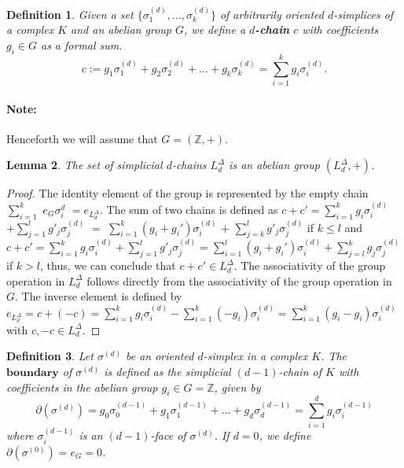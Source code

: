 \documentclass{amsart}
\newtheorem{definition}{Definition}[section]
\newtheorem{lemma}[definition]{Lemma}
\begin{document}
\begin{definition}
Given a set $\{\sigma_1^{(d)}, \ldots, \sigma_k^{(d)}\}$ of arbitrarily oriented $d$-simplices of a complex $K$ and an abelian group $G$, we define a \textbf{$d$-chain} $c$ with coefficients $g_i \in G$ as a formal sum.
\begin{equation}
c := g_1 \sigma^{(d)}_1 + g_2 \sigma^{(d)}_2 + \ldots + g_k \sigma^{(d)}_k = \sum_{i=1}^{k} g_i \sigma^{(d)}_i.
\end{equation}
\end{definition}

\paragraph{Note:} Henceforth we will assume that $G = (\mathbb{Z},+)$.

\begin{lemma}
The set of simplicial $d$-chains $L^\Delta_d$ is an abelian group $(L^\Delta_d,+)$.
\end{lemma}
\begin{proof}
The identity element of the group is represented by the empty chain $\sum_{i=1}^{k}$ $e_G \sigma^{d}_i$ $= e_{L_d^\Delta}$. The sum of two chains is defined as $c+c' = \sum_{i=1}^{k} g_i \sigma_i^{(d)}$ $+ \sum_{j=1}^{l} g'_j \sigma_j^{(d)}$ $=$ $\sum_{i=1}^{k} (g_i+g_i') \sigma_i^{(d)}$ $+$ $\sum_{j=k}^{l} g'_j \sigma_j^{(d)}$ if $k \leq l$ and $c+c' = \sum_{i=1}^{k} g_i \sigma_i^{(d)} + \sum_{j=1}^{l} g'_j \sigma_j^{(d)} = \sum_{i=1}^{l} (g_i+g_i') \sigma_i^{(d)} + \sum_{j=l}^{k} g_j \sigma_j^{(d)}$ if $k > l$, thus, we can conclude that $c+c' \in L^\Delta_d$. The associativity of the group operation in $L^\Delta_d$ follows directly from the associativity of the group operation in $G$. The inverse element is defined by $e_{L^\Delta_d} = c + (-c) = \sum_{i=1}^{k} g_i \sigma_i^{(d)} - \sum_{i=1}^{k} (-g_i) \sigma_i^{(d)} = \sum_{i=1}^{k} (g_i-g_i) \sigma_i^{(d)}$ with $c,-c \in L^\Delta_d$.
\end{proof}

\begin{definition}
Let $\sigma^{(d)}$ be an oriented $d$-simplex in a complex $K$. The $\textbf{boundary}$ of $\sigma^{(d)}$ is defined as the simplicial $(d-1)$-chain of $K$ with coefficients in the abelian group $g_i \in G = \mathbb{Z}$, given by
\begin{equation}
\partial(\sigma^{(d)}) = g_0 \sigma^{(d-1)}_0 + g_1 \sigma^{(d-1)}_1 + \ldots + g_d \sigma^{(d-1)}_d = \sum_{i=1}^{d} g_i \sigma^{(d-1)}_i
\end{equation}
where $\sigma^{(d-1)}_i$ is an $(d-1)$-face of $\sigma^{(d)}$. If $d=0$, we define $\partial(\sigma^{(0)}) = e_G = 0$.
\end{definition}
\end{document}
